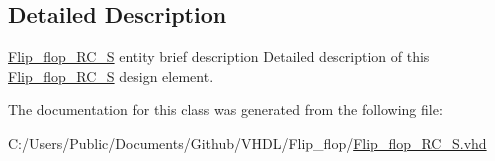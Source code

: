 \subsection{Detailed Description}
\hyperlink{class_flip__flop___r_c___s}{Flip\+\_\+flop\+\_\+\+R\+C\+\_\+S} entity brief description Detailed description of this \hyperlink{class_flip__flop___r_c___s}{Flip\+\_\+flop\+\_\+\+R\+C\+\_\+S} design element. 

The documentation for this class was generated from the following file\+:\begin{DoxyCompactItemize}
\item 
C\+:/\+Users/\+Public/\+Documents/\+Github/\+V\+H\+D\+L/\+Flip\+\_\+flop/\hyperlink{_flip__flop___r_c___s_8vhd}{Flip\+\_\+flop\+\_\+\+R\+C\+\_\+\+S.\+vhd}\end{DoxyCompactItemize}
